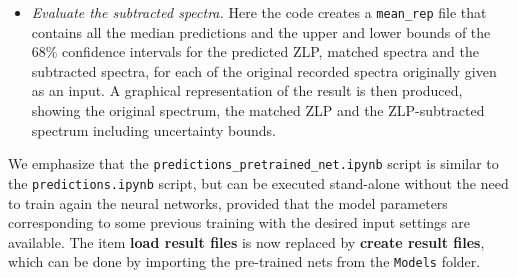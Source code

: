 \begin{itemize}
\item {\it Evaluate the subtracted spectra.}
%
Here the code creates a {\tt mean\_rep} file that contains
all the median predictions and the upper and lower bounds of the 68\% confidence intervals for 
the predicted ZLP, matched spectra and the subtracted spectra, for each of the original recorded
spectra originally given as an input. 
%
A graphical representation
of the result is then produced, showing the original spectrum, the matched
ZLP and the ZLP-subtracted spectrum including uncertainty bounds. 

\end{itemize}

We emphasize that the {\tt predictions_pretrained_net.ipynb} script is similar to the 
{\tt predictions.ipynb} script, but 
can be executed stand-alone
without the need to train again the neural networks, provided that
the model parameters corresponding to some previous training with
the desired input settings are available.
The item {\bf load result files} is now replaced by {\bf create result files}, 
which can be done by importing the pre-trained nets from the {\tt Models} folder. 



















